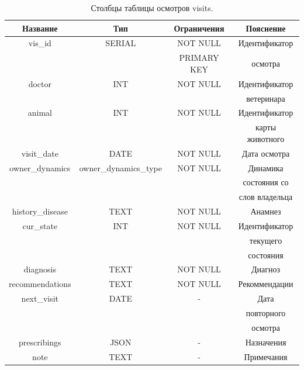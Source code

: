 \documentclass[a4paper,14pt]{article}
\begin{document}
\newpage
\begin{table}[!h]
	\caption{Столбцы таблицы осмотров visits.}
	\begin{center}
		\begin{tabular}{| c | c | c | c |}
	 	\hline
		Название & Тип & Ограничения & Пояснение \\ \hline
		vis\_id & SERIAL & NOT NULL & Идентификатор \\ 
		 &  & PRIMARY KEY & осмотра \\ \hline
		doctor & INT & NOT NULL & Идентификатор \\
		 &  &   & ветеринара \\ \hline
		animal & INT & NOT NULL & Идентификатор \\
		 &  &   & карты животного \\ \hline
		visit\_date & DATE & NOT NULL & Дата осмотра \\ \hline
		owner\_dynamics & owner\_dynamics\_type & NOT NULL & Динамика \\
		&  &  & состояния со \\
		 &  &  & слов владельца \\ \hline
		history\_disease & TEXT & NOT NULL & Анамнез \\ \hline
		cur\_state & INT & NOT NULL & Идентификатор \\
		 &  & & текущего \\ 
		 &  &  & состояния \\ \hline
		diagnosis & TEXT & NOT NULL & Диагноз \\ \hline
		recommendations & TEXT & NOT NULL & Рекоммендации \\ \hline
		next\_visit & DATE & - & Дата \\
		 &  &  & повторного \\
		 &  &  & осмотра \\ \hline
		prescribings & JSON & - & Назначения \\ \hline
		note & TEXT & - & Примечания \\ \hline
	\end{tabular}
	\end{center}
\end{table}
\end{document}
